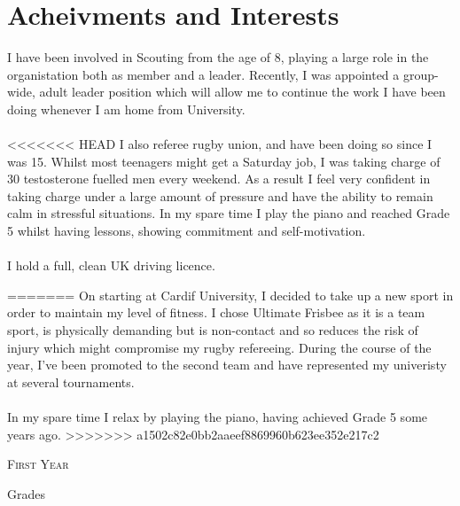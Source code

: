 \documentclass[a4paper, 11pt]{article}
\begin{document}
\section{Acheivments and Interests}
I have been involved in Scouting from the age of 8, playing a large role in the organistation both as member and a leader. Recently, I was appointed a group-wide, adult leader position which will allow me to continue the work I have been doing whenever I am home from University. \\
\\
<<<<<<< HEAD
I also referee rugby union, and have been doing so since I was 15. Whilst most teenagers might get a Saturday job, I was taking charge of 30 testosterone fuelled men every weekend. As a result I feel very confident in taking charge under a large amount of pressure and have the ability to remain calm in stressful situations. In my spare time I play the piano and reached Grade 5 whilst having lessons, showing commitment and self-motivation. \\
\\
I hold a full, clean UK driving licence.

=======
On starting at Cardif University, I decided to take up a new sport in order to maintain my level of fitness. I chose Ultimate Frisbee as it is a team sport, is physically demanding but is non-contact and so reduces the risk of injury which might compromise my rugby refereeing. During the course of the year, I've been promoted to the second team and have represented my univeristy at several tournaments. \\
\\
In my spare time I relax by playing the piano, having achieved Grade 5 some years ago.
>>>>>>> a1502c82e0bb2aaeef8869960b623ee352e217c2
\bigskip
\par{\centering\Large {\textsc{First Year}}
\par}\large{\centering Grades\par}\normalsize
\end{document}
